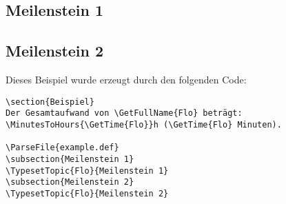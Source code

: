 \documentclass{article}
\begin{document}
\subsection{Meilenstein 1}
\subsection{Meilenstein 2}

Dieses Beispiel wurde erzeugt durch den folgenden Code:
\begin{Verbatim}
\section{Beispiel}
Der Gesamtaufwand von \GetFullName{Flo} beträgt:
\MinutesToHours{\GetTime{Flo}}h (\GetTime{Flo} Minuten).

\ParseFile{example.def}
\subsection{Meilenstein 1}
\TypesetTopic{Flo}{Meilenstein 1}
\subsection{Meilenstein 2}
\TypesetTopic{Flo}{Meilenstein 2}
\end{Verbatim}

\clearpage\appendix
{}
\printindex
\end{document}
